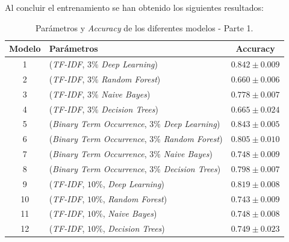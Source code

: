 \documentclass[es]{uc3mreport}
\begin{document}
\begin{report}
    Al concluir el entrenamiento se han obtenido los siguientes resultados:

    \begin{table}[H]
        \begin{center}
            \begin{tabular}{ @{}clc@{} }
                \toprule
                Modelo & Parámetros\footnotemark[1] & Accuracy\\
                \midrule
                1  & (\textit{TF-IDF}, $3\%$                 \textit{Deep Learning})  & $0.842 \pm 0.009$ \\
                2  & (\textit{TF-IDF}, $3\%$                 \textit{Random Forest})  & $0.660 \pm 0.006$ \\
                3  & (\textit{TF-IDF}, $3\%$                 \textit{Naive Bayes})    & $0.778 \pm 0.007$ \\
                4  & (\textit{TF-IDF}, $3\%$                 \textit{Decision Trees}) & $0.665 \pm 0.024$ \\
                5  & (\textit{Binary Term Occurrence}, $3\%$ \textit{Deep Learning})  & $0.843 \pm 0.005$ \\
                6  & (\textit{Binary Term Occurrence}, $3\%$ \textit{Random Forest})  & $0.805 \pm 0.010$ \\
                7  & (\textit{Binary Term Occurrence}, $3\%$ \textit{Naive Bayes})    & $0.748 \pm 0.009$ \\
                8  & (\textit{Binary Term Occurrence}, $3\%$ \textit{Decision Trees}) & $0.798 \pm 0.007$ \\
                9  & (\textit{TF-IDF}, $10\%$,               \textit{Deep Learning})  & $0.819 \pm 0.008$ \\
                10 & (\textit{TF-IDF}, $10\%$,               \textit{Random Forest})  & $0.743 \pm 0.009$ \\
                11 & (\textit{TF-IDF}, $10\%$,               \textit{Naive Bayes})    & $0.748 \pm 0.008$ \\
                12 & (\textit{TF-IDF}, $10\%$,               \textit{Decision Trees}) & $0.749 \pm 0.023$ \\
                \bottomrule
            \end{tabular}
            \caption{Parámetros y \textit{Accuracy} de los diferentes modelos -
            Parte 1.}
        \end{center}
    \end{table}


\end{report}
\end{document}
